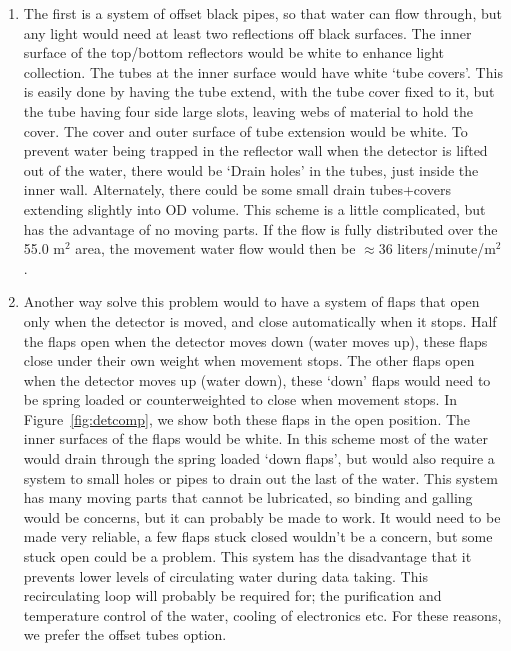 \begin{enumerate}
\item The first is a system of offset black pipes, so that water can flow through,
 but any light would need at least two reflections off black surfaces. The inner
 surface of the top/bottom reflectors would be white to enhance light collection.
 The tubes at the inner surface would have white `tube covers'. This is easily
 done by having the tube extend, with the tube cover fixed to it, but the tube
 having four side large slots, leaving webs of material to hold the cover. The
 cover and outer surface of tube extension would be white. To prevent water
 being trapped in the reflector wall when the detector is lifted out of the
 water, there would be `Drain holes' in the tubes, just inside the inner wall.
 Alternately, there could be some small drain tubes+covers extending slightly into OD
 volume. This scheme is a little complicated, but has the advantage of no moving parts. 
If the flow is fully distributed over the 55.0 m$^2$ area, the movement water flow would
 then be $\approx$36 liters/minute/m$^2$.
 
\item Another way solve this
 problem would to have a system of flaps that open only when the detector is moved,
 and close automatically when it stops. Half the flaps open when the detector moves
 down (water moves up), these flaps close under their own weight when movement stops.
 The other flaps open when the detector moves up (water down), these `down' flaps
 would need to be spring loaded or counterweighted to close when movement stops.
 In Figure~\ref{fig:detcomp}, we show both these flaps in the open position. The inner surfaces
 of the flaps would be white. In this scheme most of the water would drain through the spring
 loaded `down flaps', but would also require a system to small holes or pipes to drain out
 the last of the water. This system has many moving parts that cannot be lubricated, so
 binding and galling would be concerns, but it can probably be made to work. It would
 need to be made very reliable, a few flaps stuck closed wouldn't be a concern, but some
 stuck open could be a problem. This system has the disadvantage that it prevents lower
 levels of circulating water during data taking. This recirculating loop will probably
 be required for; the purification and temperature control of the water, cooling of
 electronics etc. For these reasons, we prefer the offset tubes option.

\end{enumerate}


